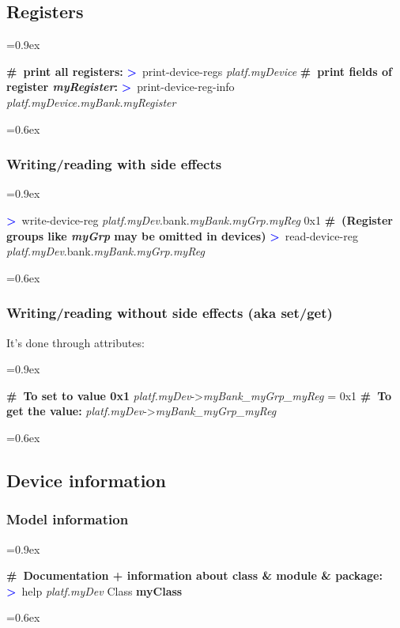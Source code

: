\documentclass[8pt]{extarticle}
\DeclareRobustCommand{\bseries}{\fontseries{b}\selectfont}
\newenvironment{code}[1][]{%
\begin{prebox}[#1]\obeylines%
\fontdimen2\font=0.9ex%
}{%
\end{prebox}%
\fontdimen2\font=0.6ex%
}
\newcommand{\ind}{\hphantom{~~~}}
\newcommand{\sprompt}{\textcolor{blue}{\textbf{>}\ }}
\newcommand{\cmtcommon}[1]{\textcolor{Sepia}{\textbf{#1}}}
\newcommand{\cmt}[1]{\cmtcommon{\#\ #1}}
\newcommand{\p}[1]{\textit{\large#1}}
\begin{document}
\begin{multicols*}{3}
\subsection{Registers}
\begin{code}
    \cmt{print all registers:}
    \sprompt print-device-regs \p{platf.myDevice}
    \cmt{print fields of register \p{myRegister}:}
    \sprompt print-device-reg-info \p{platf.myDevice.myBank.myRegister}
\end{code}

\subsubsection{Writing/reading with side effects}

\begin{code}
    \sprompt write-device-reg
    \ind \ind \p{platf.myDev}.bank.\p{myBank.myGrp.myReg} 0x1
    \cmt{(Register groups like \p{myGrp} may be omitted in devices)}
    \sprompt read-device-reg \p{platf.myDev}.bank.\p{myBank.myGrp.myReg}
\end{code}

\subsubsection{Writing/reading {\bseries without} side effects (aka set/get)}

It's done through attributes:
\begin{code}
    \cmt{To set to value 0x1}
    \p{platf.myDev}->\p{myBank_myGrp_myReg} = 0x1
    \cmt{To get the value:}
    \p{platf.myDev}->\p{myBank_myGrp_myReg}
\end{code}

\subsection{Device information}

\subsubsection{Model information}

\begin{code}
    \cmt{Documentation + information about class \& module \& package:}
    \sprompt help \p{platf.myDev}
    Class \textbf{myClass}


\end{code}
\end{multicols*}
\end{document}

